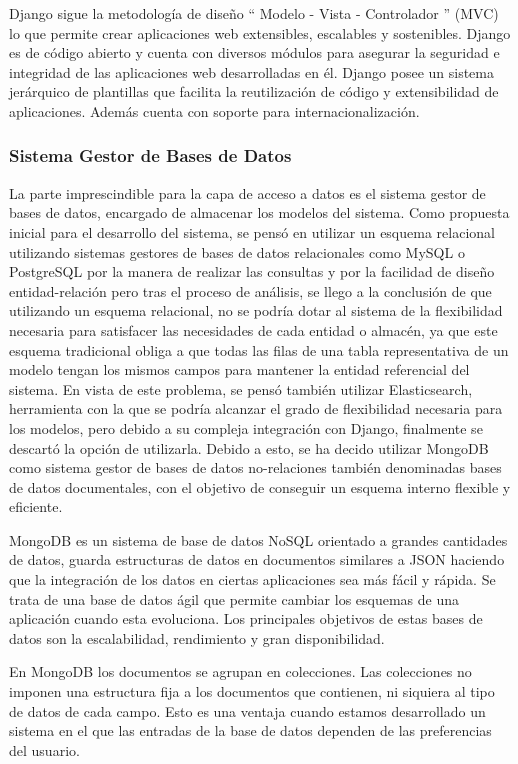 \documentclass[a4paper,11pt]{book}
\begin{document}
Django sigue la metodología de diseño “ Modelo - Vista - Controlador ” (MVC) lo que permite crear aplicaciones web extensibles, escalables y sostenibles. Django es de código abierto y cuenta con diversos módulos para asegurar la seguridad e integridad de las aplicaciones web desarrolladas en él. 
Django posee un sistema jerárquico de plantillas que facilita la reutilización de código y extensibilidad de aplicaciones. Además cuenta con soporte para internacionalización.
\subsubsection{Sistema Gestor de Bases de Datos}
La parte imprescindible para la capa de acceso a datos es el sistema gestor de bases de datos, encargado de almacenar los modelos del sistema. Como propuesta inicial para el desarrollo del sistema, se pensó en utilizar un esquema relacional utilizando sistemas gestores de bases de datos relacionales como MySQL o PostgreSQL por la manera de realizar las consultas y por la facilidad de diseño entidad-relación pero tras el proceso de análisis, se llego a la conclusión de que utilizando un esquema relacional, no se podría dotar al sistema de la flexibilidad necesaria para satisfacer las necesidades de cada entidad o almacén, ya que este esquema tradicional obliga a que todas las filas de una tabla representativa de un modelo tengan los mismos campos para mantener la entidad referencial del sistema. En vista de este problema, se pensó también utilizar Elasticsearch, herramienta con la que se podría alcanzar el grado de flexibilidad necesaria para los modelos, pero debido a su compleja integración con Django, finalmente se descartó la opción de utilizarla. Debido a esto, se ha decido utilizar MongoDB\cite{mg} como sistema gestor de bases de datos no-relaciones también denominadas bases de datos documentales, con el objetivo de conseguir un esquema interno flexible y eficiente. 

MongoDB es un sistema de base de datos NoSQL orientado a grandes cantidades de datos, guarda estructuras de datos en documentos similares a JSON haciendo que la integración de los datos en ciertas aplicaciones sea más fácil y rápida.
Se trata de una base de datos ágil que permite cambiar los esquemas de una aplicación cuando esta evoluciona. Los principales objetivos de estas bases de datos son la escalabilidad, rendimiento y gran disponibilidad.

En MongoDB los documentos se agrupan en colecciones. Las colecciones  no imponen una estructura fija a los documentos que contienen, ni siquiera al tipo de datos de cada campo. Esto es una ventaja cuando estamos desarrollado un sistema en el que las entradas de la base de datos dependen de las preferencias del usuario.
\end{document}
